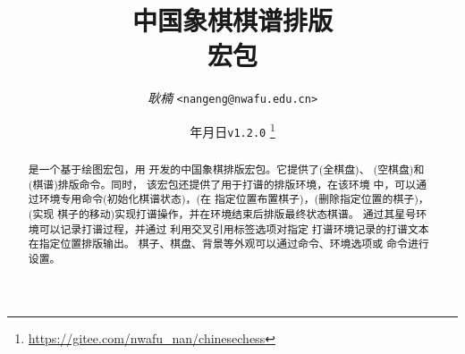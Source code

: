 \documentclass[full]{l3doc}
\def\vers{\texttt{v1.2.0} }
\begin{document}
\title{
  中国象棋棋谱排版\\ 宏包
}
\author{\textit{耿楠} \texttt{<nangeng@nwafu.edu.cn>}}
\date{\the\year 年\the\month 月\the\day 日\qquad \vers
\thanks{\url{https://gitee.com/nwafu_nan/chinesechess}}
}

\maketitle

\begin{abstract}
  是一个基于绘图宏包，用%
  开发的中国象棋排版宏包。它提供了(全棋盘)、%
  (空棋盘)和(棋谱)排版命令。同时，
  该宏包还提供了用于打谱的排版环境，在该环境
  中，可以通过环境专用命令(初始化棋谱状态)，(在
  指定位置布置棋子)，(删除指定位置的棋子)，(实现
  棋子的移动)实现打谱操作，并在环境结束后排版最终状态棋谱。
  通过其星号环境可以记录打谱过程，并通过%
  利用交叉引用标签选项对指定%
  打谱环境记录的打谱文本在指定位置排版输出。
  棋子、棋盘、背景等外观可以通过命令、环境选项或%
  命令进行设置。
\end{abstract}

{\small
\tableofcontents
}
\newpage
\end{document}
